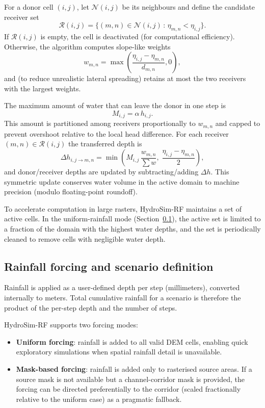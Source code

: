 \documentclass[a4paper,fleqn]{cas-sc}
\begin{document}
For a donor cell $(i,j)$, let $\mathcal{N}(i,j)$ be its neighbours and define the candidate receiver set
\begin{equation}
\mathcal{R}(i,j) = \{(m,n) \in \mathcal{N}(i,j)\, : \, \eta_{m,n} < \eta_{i,j}\}.
\end{equation}
If $\mathcal{R}(i,j)$ is empty, the cell is deactivated (for computational efficiency). Otherwise, the algorithm computes slope-like weights
\begin{equation}
w_{m,n} = \max\left(\frac{\eta_{i,j} - \eta_{m,n}}{d_{m,n}}, 0\right),
\end{equation}
and (to reduce unrealistic lateral spreading) retains at most the two receivers with the largest weights.

The maximum amount of water that can leave the donor in one step is
\begin{equation}
M_{i,j} = \alpha\, h_{i,j}.
\end{equation}
This amount is partitioned among receivers proportionally to $w_{m,n}$ and capped to prevent overshoot relative to the local head difference. For each receiver $(m,n) \in \mathcal{R}(i,j)$ the transferred depth is
\begin{equation}
\Delta h_{i,j \to m,n} = \min\left( M_{i,j}\,\frac{w_{m,n}}{\sum w},\; \frac{\eta_{i,j}-\eta_{m,n}}{2} \right),
\end{equation}
and donor/receiver depths are updated by subtracting/adding $\Delta h$. This symmetric update conserves water volume in the active domain to machine precision (modulo floating-point roundoff).

To accelerate computation in large rasters, HydroSim-RF maintains a set of active cells. In the uniform-rainfall mode (Section~\ref{subsec:methodology_rainfall}), the active set is limited to a fraction of the domain with the highest water depths, and the set is periodically cleaned to remove cells with negligible water depth.

\subsection{Rainfall forcing and scenario definition}\label{subsec:methodology_rainfall}
Rainfall is applied as a user-defined depth per step (millimeters), converted internally to meters. Total cumulative rainfall for a scenario is therefore the product of the per-step depth and the number of steps.

HydroSim-RF supports two forcing modes:
\begin{itemize}
    \item \textbf{Uniform forcing}: rainfall is added to all valid DEM cells, enabling quick exploratory simulations when spatial rainfall detail is unavailable.
    \item \textbf{Mask-based forcing}: rainfall is added only to rasterised source areas. If a source mask is not available but a channel-corridor mask is provided, the forcing can be directed preferentially to the corridor (scaled fractionally relative to the uniform case) as a pragmatic fallback.
\end{itemize}
\end{document}
